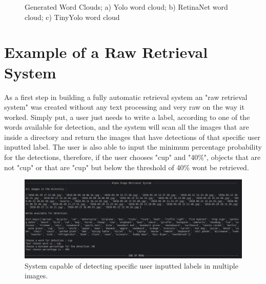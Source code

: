 \begin{figure}[H]
\begin{subfigure}{0.3\textwidth}
      \caption{}
      \end{subfigure}
      \caption[Generated Word Clouds]{Generated Word Clouds; a) Yolo word cloud; b) RetinaNet word cloud; c) TinyYolo word cloud}
      \label{fig:wordcloudss}
    \end{figure}

    

     

\section{Example of a Raw Retrieval System}
\label{sec:alpha_retrieval}

As a first step in building a fully automatic retrieval system an "raw retrieval system" was created without any text processing and very raw on the way it worked. Simply put, a user just needs to write a label, according to one of the words available for detection, and the system will scan all the images that are inside a directory and return the images that have detections of that specific user inputted label. The user is also able to input the minimum percentage probability for the detections, therefore, if the user chooses "cup" and "40\%", objects that are not "cup" or that are "cup" but below the threshold of 40\% wont be retrieved.

\begin{figure}[H]
  \centering
  \includegraphics[width = \textwidth]{Sections/4InitialWork/4_images_random/alpha.png}
  \caption[Raw retrieval system]{System capable of detecting specific user inputted labels in multiple images. }
  \label{fig:yolov3} 
\end{figure}




